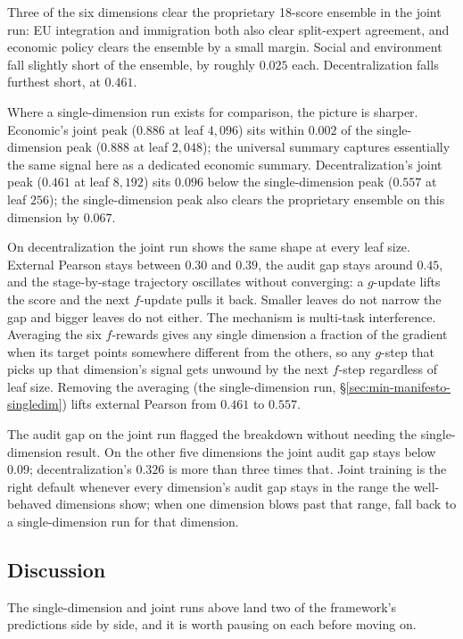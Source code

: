 Three of the six dimensions clear the proprietary 18-score
ensemble in the joint run: EU integration and immigration both also
clear split-expert agreement, and economic policy clears the
ensemble by a small margin. Social and environment fall slightly
short of the ensemble, by roughly $0.025$ each. Decentralization
falls furthest short, at $0.461$.

Where a single-dimension run exists for comparison, the picture is
sharper. Economic's joint peak ($0.886$ at leaf $4{,}096$) sits
within $0.002$ of the single-dimension peak ($0.888$ at leaf
$2{,}048$); the universal summary captures essentially the same
signal here as a dedicated economic summary. Decentralization's
joint peak ($0.461$ at leaf $8{,}192$) sits $0.096$ below the
single-dimension peak ($0.557$ at leaf $256$); the single-dimension
peak also clears the proprietary ensemble on this dimension by
$0.067$.

On decentralization the joint run shows the same shape at every
leaf size. External Pearson stays between $0.30$ and $0.39$, the
audit gap stays around $0.45$, and the stage-by-stage trajectory
oscillates without converging: a $g$-update lifts the score and
the next $f$-update pulls it back. Smaller leaves do not narrow
the gap and bigger leaves do not either. The mechanism is
multi-task interference. Averaging the six $f$-rewards gives any
single dimension a fraction of the gradient when its target points
somewhere different from the others, so any $g$-step that picks up
that dimension's signal gets unwound by the next $f$-step
regardless of leaf size. Removing the averaging (the
single-dimension run, \S\ref{sec:min-manifesto-singledim})
lifts external Pearson from $0.461$ to $0.557$.

The audit gap on the joint run flagged the breakdown without
needing the single-dimension result. On the other five dimensions
the joint audit gap stays below $0.09$; decentralization's $0.326$
is more than three times that. Joint training is the right default
whenever every dimension's audit gap stays in the range the
well-behaved dimensions show; when one dimension blows past that
range, fall back to a single-dimension run for that dimension.

\subsection{Discussion}\label{sec:min-manifesto-takeaways}

The single-dimension and joint runs above land two of the
framework's predictions side by side, and it is worth pausing on
each before moving on.

